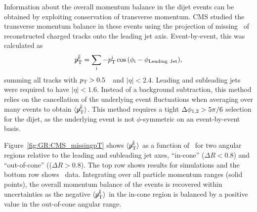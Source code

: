 Information about the overall momentum balance in the dijet events can be obtained by exploiting
conservation of transverse momentum. CMS studied the transverse momentum balance in these events
using the projection of missing \pT\ of reconstructed charged tracks onto the leading jet axis.
Event-by-event, this was calculated as
\begin{equation}
\displaystyle{\not} p_{\mathrm{T}}^{\parallel} =
\sum_{\rm i}{ -p_{\mathrm{T}}^{\rm i}\cos{(\phi_{\rm i}-\phi_{\rm Leading\ Jet})}},
\end{equation}
summing all tracks with $\mbox{$p_{\mathrm{T}}$} > 0.5$~\GeVc\ and $|\eta| < 2.4$.
Leading and subleading jets were required to have $|\eta| < 1.6$.
Instead of a background subtraction, this method relies on the cancellation of the
underlying event fluctuations when averaging over many events to obtain
$\langle \displaystyle{\not} p_{\mathrm{T}}^{\parallel} \rangle$.
This method requires a tight $\Delta\phi_{1,2} > 5 \pi/6$ selection for the dijet, as the underlying
event is not $\phi$-symmetric on an event-by-event basis.

Figure~\ref{fig:GR:CMS_missingpT} shows $\langle \displaystyle{\not} p_{\mathrm{T}}^{\parallel} \rangle$
as a function of \AJ\ for two angular regions relative to the leading and subleading
jet axes, ``in-cone'' ($\Delta R < 0.8$) and ``out-of-cone'' (($\Delta R > 0.8$).
The top row shows results for  {} simulations and the bottom row shows
\PbPb\ data. Integrating over all particle momentum ranges (solid points),
 the overall momentum balance of the events is recovered within uncertainties
as the negative $\langle \displaystyle{\not} p_{\mathrm{T}}^{\parallel} \rangle$ in
the in-cone region is balanced by a positive value in the out-of-cone angular range.

